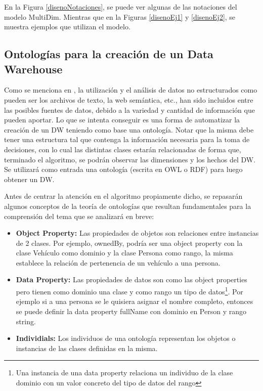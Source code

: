 \documentclass[a4paper,11pt]{article}
\begin{document}
      En la Figura \ref{disenoNotaciones}, se puede ver algunas de las notaciones del modelo MultiDim. Mientras que en la Figuras \ref{disenoEj1} y \ref{disenoEj2},
      se muestra ejemplos que utilizan el modelo.
      
  
    
    \subsection{Ontologías para la creación de un Data Warehouse}
    
    Como se menciona en \cite{ontologias}, la utilización y el análisis de datos no estructurados como pueden ser los archivos de texto, la web
    semántica, etc., han sido incluidos entre las posibles fuentes de datos, debido a la variedad y cantidad de información que pueden aportar. Lo que
    se intenta conseguir es una forma de automatizar la creación de un DW teniendo como base una ontología. Notar que la misma debe tener una
    estructura tal que contenga la información necesaria para la toma de decisiones, con lo cual las distintas clases estarán relacionadas de forma
    que, terminado el algoritmo, se podrán observar las dimensiones y los hechos del DW. Se utilizará como entrada una ontología (escrita en OWL o RDF)
    para luego obtener un DW.\par
    
    Antes de centrar la atención en el algoritmo propiamente dicho, se repasarán algunos conceptos de la teoría de ontologías que resultan fundamentales
    para la comprensión del tema que se analizará en breve:
    
    \begin{itemize}
      \item \textbf{Object Property:} Las propiedades de objetos son relaciones entre instancias de 2 clases. Por ejemplo, ownedBy, podría ser una
      object property con la clase Vehículo como dominio y la clase Persona como rango, la misma establece la relación de pertenencia de un vehículo a
      una persona.
      \item \textbf{Data Property:} Las propiedades de datos son como las object properties pero tienen como dominio una clase y como rango un tipo de
      datos\footnote{Una instancia de una data property relaciona un individuo de la clase dominio con un valor concreto del tipo de datos del rango}.
      Por ejemplo si a una persona se le quisiera asignar el nombre completo, entonces se puede definir la data property fullName con dominio en Person
      y rango string.
      \item \textbf{Individials:} Los individuos de una ontología representan los objetos o instancias de las clases definidas en la misma.
    \end{itemize}
    
\end{document}
